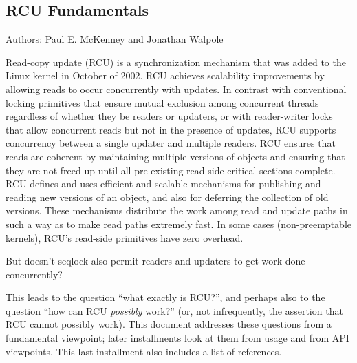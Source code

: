 
\subsection{RCU Fundamentals}
\label{sec:defer:RCU Fundamentals}

Authors: Paul E. McKenney and Jonathan Walpole

Read-copy update (RCU) is a synchronization mechanism that was added to
the Linux kernel in October of 2002.
RCU achieves scalability
improvements by allowing reads to occur concurrently with updates.
In contrast with conventional locking primitives that ensure mutual exclusion
among concurrent threads regardless of whether they be readers or
updaters, or with reader-writer locks that allow concurrent reads but not in
the presence of updates, RCU supports concurrency between a single
updater and multiple readers.
RCU ensures that reads are coherent by
maintaining multiple versions of objects and ensuring that they are not
freed up until all pre-existing read-side critical sections complete.
RCU defines and uses efficient and scalable mechanisms for publishing
and reading new versions of an object, and also for deferring the collection
of old versions.
These mechanisms distribute the work among read and
update paths in such a way as to make read paths extremely fast. In some
cases (non-preemptable kernels), RCU's read-side primitives have zero
overhead.

\QuickQuiz{}
	But doesn't seqlock also permit readers and updaters to get
	work done concurrently?
 \QuickQuizEnd

This leads to the question ``what exactly is RCU?'', and perhaps also
to the question ``how can RCU \emph{possibly} work?'' (or, not
infrequently, the assertion that RCU cannot possibly work).
This document addresses these questions from a fundamental viewpoint;
later installments look at them from usage and from API viewpoints.
This last installment also includes a list of references.

